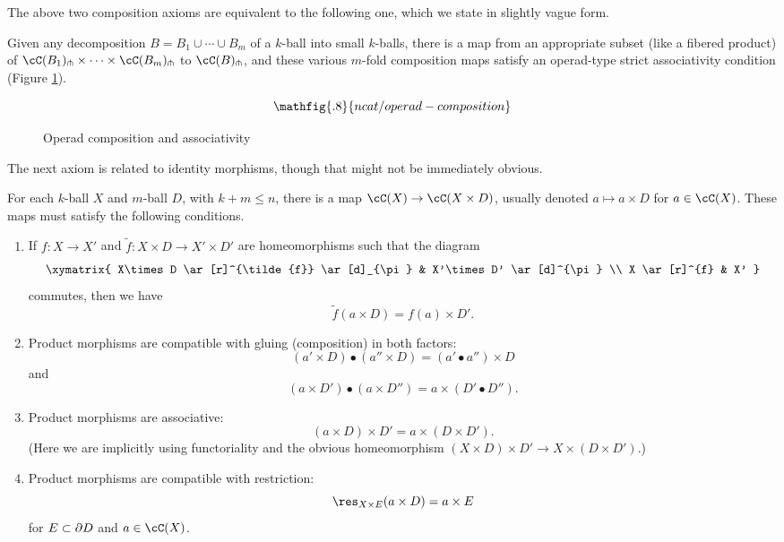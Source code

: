 The above two composition axioms are equivalent to the following one,
which we state in slightly vague form.

{Given any decomposition $B = B_1\cup\cdots\cup B_m$ of a $k$-ball
into small $k$-balls, there is a 
map from an appropriate subset (like a fibered product) 
of $\cC(B_1)\spl\times\cdots\times\cC(B_m)\spl$ to $\cC(B)\spl$,
and these various $m$-fold composition maps satisfy an
operad-type strict associativity condition (Figure \ref{fig:operad-composition}).}

\begin{figure}[!ht]
$$\mathfig{.8}{ncat/operad-composition}$$
\caption{Operad composition and associativity}\label{fig:operad-composition}\end{figure}

The next axiom is related to identity morphisms, though that might not be immediately obvious.

\begin{axiom}
For each $k$-ball $X$ and $m$-ball $D$, with $k+m \le n$, there is a map $\cC(X)\to \cC(X\times D)$, 
usually denoted $a\mapsto a\times D$ for $a\in \cC(X)$.
These maps must satisfy the following conditions.
\begin{enumerate}
\item
If $f:X\to X'$ and $\tilde{f}:X\times D \to X'\times D'$ are homeomorphisms such that the diagram
\[ \xymatrix{
	X\times D \ar[r]^{\tilde{f}} \ar[d]_{\pi} & X'\times D' \ar[d]^{\pi} \\
	X \ar[r]^{f} & X'
} \]
commutes, then we have 
\[
	\tilde{f}(a\times D) = f(a)\times D' .
\]
\item
Product morphisms are compatible with gluing (composition) in both factors:
\[
	(a'\times D)\bullet(a''\times D) = (a'\bullet a'')\times D
\]
and
\[
	(a\times D')\bullet(a\times D'') = a\times (D'\bullet D'') .
\]
\item
Product morphisms are associative:
\[
	(a\times D)\times D' = a\times (D\times D') .
\]
(Here we are implicitly using functoriality and the obvious homeomorphism
$(X\times D)\times D' \to X\times(D\times D')$.)
\item
Product morphisms are compatible with restriction:
\[
	\res_{X\times E}(a\times D) = a\times E
\]
for $E\subset \partial D$ and $a\in \cC(X)$.
\end{enumerate}
\end{axiom}

